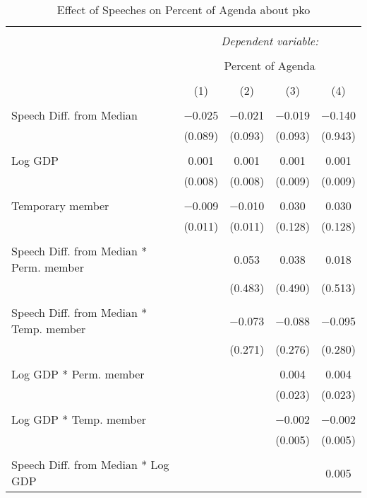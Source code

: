 
\begin{table}[!htbp] \centering 
  \caption{Effect of Speeches on Percent of Agenda about pko} 
  \label{} 
\begin{tabular}{@{\extracolsep{5pt}}lcccc} 
\\[-1.8ex]\hline 
\hline \\[-1.8ex] 
 & \multicolumn{4}{c}{\textit{Dependent variable:}} \\ 
\cline{2-5} 
\\[-1.8ex] & \multicolumn{4}{c}{Percent of Agenda} \\ 
\\[-1.8ex] & (1) & (2) & (3) & (4)\\ 
\hline \\[-1.8ex] 
 Speech Diff. from Median & $-$0.025 & $-$0.021 & $-$0.019 & $-$0.140 \\ 
  & (0.089) & (0.093) & (0.093) & (0.943) \\ 
  & & & & \\ 
 Log GDP & 0.001 & 0.001 & 0.001 & 0.001 \\ 
  & (0.008) & (0.008) & (0.009) & (0.009) \\ 
  & & & & \\ 
 Temporary member & $-$0.009 & $-$0.010 & 0.030 & 0.030 \\ 
  & (0.011) & (0.011) & (0.128) & (0.128) \\ 
  & & & & \\ 
 Speech Diff. from Median * Perm. member &  & 0.053 & 0.038 & 0.018 \\ 
  &  & (0.483) & (0.490) & (0.513) \\ 
  & & & & \\ 
 Speech Diff. from Median * Temp. member &  & $-$0.073 & $-$0.088 & $-$0.095 \\ 
  &  & (0.271) & (0.276) & (0.280) \\ 
  & & & & \\ 
 Log GDP * Perm. member &  &  & 0.004 & 0.004 \\ 
  &  &  & (0.023) & (0.023) \\ 
  & & & & \\ 
 Log GDP * Temp. member &  &  & $-$0.002 & $-$0.002 \\ 
  &  &  & (0.005) & (0.005) \\ 
  & & & & \\ 
 Speech Diff. from Median * Log GDP &  &  &  & 0.005 \\ 

\end{tabular}
\end{table}
